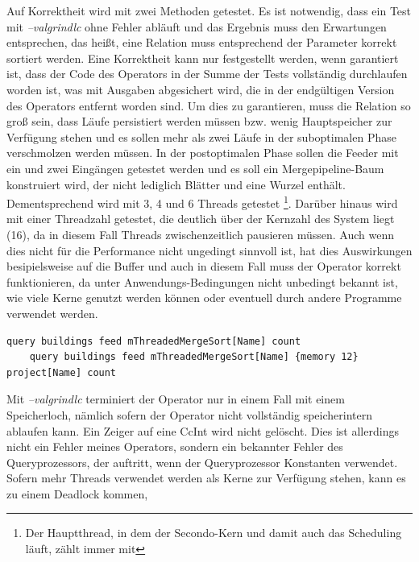 \documentclass[a4paper,12pt,twoside]{article}
\newcommand{\Fb}[1]{\textit{#1}} %
\begin{document}
Auf Korrektheit wird mit zwei Methoden getestet. Es ist notwendig, dass ein Test mit \Fb{--valgrindlc} ohne Fehler abläuft und das Ergebnis muss den Erwartungen entsprechen, das heißt, eine Relation muss entsprechend der Parameter korrekt sortiert werden. Eine Korrektheit kann nur festgestellt werden, wenn garantiert ist, dass der Code des Operators in der Summe der Tests vollständig durchlaufen worden ist, was mit Ausgaben abgesichert wird, die in der endgültigen Version des Operators entfernt worden sind. Um dies zu garantieren, muss die Relation so groß sein, dass Läufe persistiert werden müssen bzw. wenig Hauptspeicher zur Verfügung stehen und es sollen mehr als zwei Läufe in der suboptimalen Phase verschmolzen werden müssen. In der postoptimalen Phase sollen die Feeder mit ein und zwei Eingängen getestet werden und es soll ein Mergepipeline-Baum konstruiert wird, der nicht lediglich Blätter und eine Wurzel enthält. Dementsprechend wird mit 3, 4 und 6 Threads getestet \footnote{Der Hauptthread, in dem der Secondo-Kern und damit auch das Scheduling läuft, zählt immer mit}. Darüber hinaus wird mit einer Threadzahl getestet, die deutlich über der Kernzahl des System liegt (16), da in diesem Fall Threads zwischenzeitlich pausieren müssen. Auch wenn dies nicht für die Performance nicht ungedingt sinnvoll ist, hat dies Auswirkungen besipielsweise auf die Buffer und auch in diesem Fall muss der Operator korrekt funktionieren, da unter Anwendungs-Bedingungen nicht unbedingt bekannt ist, wie viele Kerne genutzt werden können oder eventuell durch andere Programme verwendet werden.

\begin{minipage}{\linewidth}
	\begin{lstlisting}[caption={Beispiel Testqueries für den Sort-Operator}, label=list:testsort]
	query buildings feed mThreadedMergeSort[Name] count
	query buildings feed mThreadedMergeSort[Name] {memory 12} project[Name] count
	\end{lstlisting}
\end{minipage}

Mit \Fb{--valgrindlc} terminiert der Operator nur in einem Fall mit einem Speicherloch, nämlich sofern der Operator nicht vollständig speicherintern ablaufen kann. Ein Zeiger auf eine CcInt wird nicht gelöscht. Dies ist allerdings nicht ein Fehler meines Operators, sondern ein bekannter Fehler des Queryprozessors, der auftritt, wenn der Queryprozessor Konstanten verwendet. Sofern mehr Threads verwendet werden als Kerne zur Verfügung stehen, kann es zu einem Deadlock kommen, 
\end{document}
